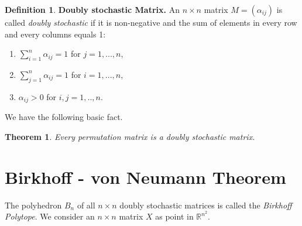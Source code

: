 \documentclass[11pt]{article}
\theoremstyle{plain}
\newtheorem{theorem}[thm]{Theorem}
\theoremstyle{definition}
\newtheorem{definition}[thm]{Definition}
\begin{document}
\begin{definition}\label{def4}
\textbf{Doubly stochastic Matrix.} An  $n \times n $  matrix $M=(\alpha_{ij}) $ is called \textit{doubly stochastic} if it is non-negative and the sum of elements in every row and every columns equals 1:
\begin{enumerate}
    \item $ \sum_{i=1}^{n}\alpha_{ij} =1 $ for $j=1,... ,n$,
    \item $ \sum_{j=1}^{n}\alpha_{ij}=1 $ for $i=1,... ,n$,
    \item $\alpha_{ij} >0$ for $i,j=1,.. ,n$.
\end{enumerate}

\end{definition}
We have the following basic fact.
\begin{theorem}
    Every \textit{permutation matrix} is a \textit{doubly stochastic} matrix.
\end{theorem}
\section{Birkhoff - von Neumann Theorem}
The polyhedron $B_{n}$ of all $n \times n$ doubly stochastic matrices is called the \textit{Birkhoff Polytope}.
We consider an $n \times n $ matrix $X$ as point in $\mathbb{R}^{n^2}$.
\end{document}
